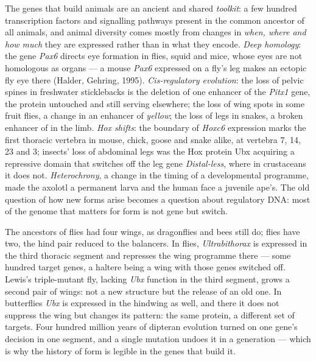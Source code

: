 \begin{definition}\label{def:b3:developmental-genetics:evodevo}
The genes that build animals are an ancient and shared \emph{toolkit}:
a few hundred transcription factors and signalling pathways present
in the common ancestor of all animals, and animal diversity comes
mostly from changes in \emph{when, where and how much} they are
expressed rather than in what they encode. \emph{Deep homology}: the
gene \emph{Pax6} directs eye formation in flies, squid and mice, whose
eyes are not homologous as organs --- a mouse \emph{Pax6} expressed on a
fly's leg makes an ectopic fly eye there (Halder, Gehring, 1995).
\emph{Cis-regulatory evolution}: the loss of pelvic spines in
freshwater sticklebacks is the deletion of one enhancer of the
\emph{Pitx1} gene, the protein untouched and still serving elsewhere;
the loss of wing spots in some fruit flies, a change in an enhancer of
\emph{yellow}; the loss of legs in snakes, a broken enhancer of
\emph{} in the limb. \emph{Hox shifts}: the boundary of
\emph{Hoxc6} expression marks the first thoracic vertebra in mouse,
chick, goose and snake alike, at vertebra 7, 14, 23 and 3; insects'
loss of abdominal legs was the Hox protein Ubx acquiring a repressive
domain that switches off the leg gene \emph{Distal-less}, where in
crustaceans it does not. \emph{Heterochrony}, a change in the timing of
a developmental programme, made the axolotl a permanent larva and the
human face a juvenile ape's. The old question of how new forms arise
becomes a question about regulatory DNA: most of the genome that
matters for form is not gene but switch.
\end{definition}

\begin{example}\label{ex:b3:developmental-genetics:four-wings}
The ancestors of flies had four wings, as dragonflies and bees still
do; flies have two, the hind pair reduced to the balancers. In flies,
\emph{Ultrabithorax} is expressed in the third thoracic segment and
represses the wing programme there --- some hundred target genes, a
haltere being a wing with those genes switched off. Lewis's
triple-mutant fly, lacking \emph{Ubx} function in the third segment,
grows a second pair of wings: not a new structure but the release of
an old one. In butterflies \emph{Ubx} is expressed in the hindwing as
well, and there it does not suppress the wing but changes its pattern:
the same protein, a different set of targets. Four hundred million
years of dipteran evolution turned on one gene's decision in one
segment, and a single mutation undoes it in a generation --- which is
why the history of form is legible in the genes that build it.
\end{example}

